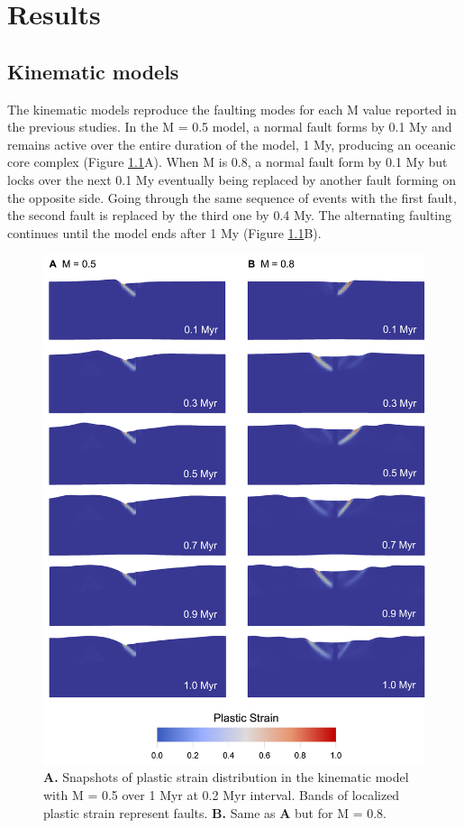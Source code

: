 \documentclass[letterpaper,12pt,notitle]{memphisthesis}                     %
\begin{document}
\chapter{Results}

\section{Kinematic models}

The kinematic models reproduce the faulting modes for each M value reported in the previous studies. In the M = 0.5 model, a normal fault forms by 0.1 My and remains active over the entire duration of the model, 1 My, producing an oceanic core complex (Figure \ref{fig:kfault}A). When M is 0.8, a normal fault form by 0.1 My but locks over the next 0.1 My eventually being replaced by another fault forming on the opposite side. Going through the same sequence of events with the first fault, the second fault is replaced by the third one by 0.4 My. The alternating faulting continues until the model ends after 1 My (Figure \ref{fig:kfault}B).
%
\begin{figure}[!htb]
	\centering
	\includegraphics[width=0.9\linewidth]{./figs/kfault.png}
	\caption{ \textbf{A.} Snapshots of plastic strain distribution in the kinematic model with M = 0.5 over 1 Myr at 0.2 Myr interval. Bands of localized plastic strain represent faults. \textbf{B.} Same as \textbf{A} but for M = 0.8.}
	\label{fig:kfault}
\end{figure}
\end{document}
